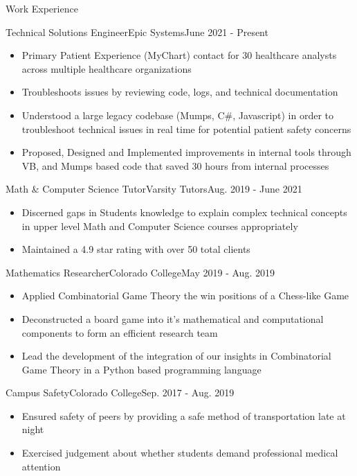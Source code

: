 \begin{cvsection}{Work Experience}
	\begin{cvsubsection}{Technical Solutions Engineer}{Epic Systems}{June 2021 - Present}			
		\begin{itemize}
			\item Primary Patient Experience (MyChart) contact for 30 healthcare analysts across multiple healthcare organizations
			\item Troubleshoots issues by reviewing code, logs, and technical documentation
			\item Understood a large legacy codebase (Mumps, C\#, Javascript) in order to troubleshoot technical issues in real time for potential patient safety concerns
			\item Proposed, Designed and Implemented improvements in internal tools through VB, and Mumps based code that saved 30 hours from internal processes
		\end{itemize}
	\end{cvsubsection}
	
	\begin{cvsubsection}{Math \& Computer Science Tutor}{Varsity Tutors}{Aug. 2019 - June 2021}	
		\begin{itemize}
			\item Discerned gaps in Students knowledge to explain complex technical concepts in upper level Math and Computer Science courses appropriately
			\item Maintained a 4.9 star rating with over 50 total clients
		\end{itemize}
	\end{cvsubsection}
	
	\begin{cvsubsection}{Mathematics Researcher}{Colorado College}{May 2019 - Aug. 2019}
	\begin{itemize}
		\item Applied Combinatorial Game Theory the win positions of a Chess-like Game
		\item Deconstructed a board game into it’s mathematical and computational components to form an efficient research team
		\item Lead the development of the integration of our insights in Combinatorial Game Theory in a Python based programming language
		\end{itemize}
	\end{cvsubsection}
	
		\begin{cvsubsection}{Campus Safety}{Colorado College}{Sep. 2017 - Aug. 2019}
	\begin{itemize}
		\item Ensured safety of peers by providing a safe method of transportation late at night
		\item Exercised judgement about whether students demand professional medical attention
		\end{itemize}
	\end{cvsubsection}
	

\end{cvsection}



